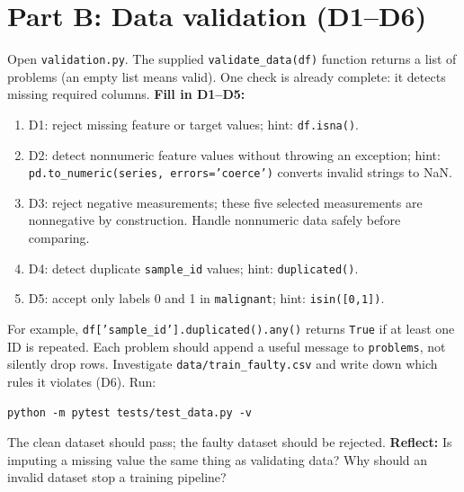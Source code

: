 \documentclass[11pt,a4paper]{article}
\begin{document}
\section{Part B: Data validation (D1--D6)}
Open \texttt{validation.py}. The supplied \texttt{validate\_data(df)} function returns a list of problems (an empty list means valid). One check is already complete: it detects missing required columns. \textbf{Fill in D1--D5:}
\begin{enumerate}
\item D1: reject missing feature or target values; hint: \texttt{df.isna()}.
\item D2: detect nonnumeric feature values without throwing an exception; hint: \texttt{pd.to\_numeric(series, errors='coerce')} converts invalid strings to NaN.
\item D3: reject negative measurements; these five selected measurements are nonnegative by construction. Handle nonnumeric data safely before comparing.
\item D4: detect duplicate \texttt{sample\_id} values; hint: \texttt{duplicated()}.
\item D5: accept only labels 0 and 1 in \texttt{malignant}; hint: \texttt{isin([0,1])}.
\end{enumerate}
For example, \texttt{df['sample\_id'].duplicated().any()} returns \texttt{True} if at least one ID is repeated. Each problem should append a useful message to \texttt{problems}, not silently drop rows. Investigate \texttt{data/train\_faulty.csv} and write down which rules it violates (D6). Run:
\begin{lstlisting}
python -m pytest tests/test_data.py -v
\end{lstlisting}
The clean dataset should pass; the faulty dataset should be rejected. \textbf{Reflect:} Is imputing a missing value the same thing as validating data? Why should an invalid dataset stop a training pipeline?
\end{document}
